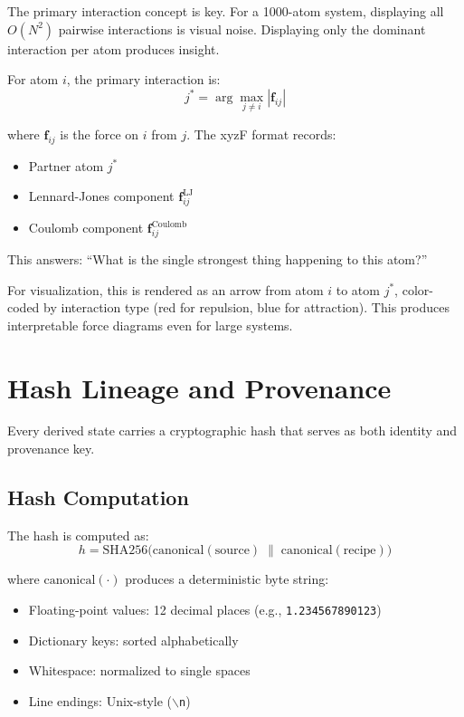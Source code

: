 \documentclass[11pt]{article}
\begin{document}
The primary interaction concept is key. For a 1000-atom system, displaying all $O(N^2)$ pairwise interactions is visual noise. Displaying only the dominant interaction per atom produces insight.

For atom $i$, the primary interaction is:
\begin{equation}
j^* = \arg\max_{j \neq i} |\mathbf{f}_{ij}|
\end{equation}

where $\mathbf{f}_{ij}$ is the force on $i$ from $j$. The xyzF format records:
\begin{itemize}
\item Partner atom $j^*$
\item Lennard-Jones component $\mathbf{f}_{ij}^{\text{LJ}}$
\item Coulomb component $\mathbf{f}_{ij}^{\text{Coulomb}}$
\end{itemize}

This answers: ``What is the single strongest thing happening to this atom?''

For visualization, this is rendered as an arrow from atom $i$ to atom $j^*$, color-coded by interaction type (red for repulsion, blue for attraction). This produces interpretable force diagrams even for large systems.

\section{Hash Lineage and Provenance}

Every derived state carries a cryptographic hash that serves as both identity and provenance key.

\subsection{Hash Computation}

The hash is computed as:
\begin{equation}
h = \text{SHA256}\bigl(\text{canonical}(\text{source}) \;\|\; \text{canonical}(\text{recipe})\bigr)
\end{equation}

where $\text{canonical}(\cdot)$ produces a deterministic byte string:
\begin{itemize}
\item Floating-point values: 12 decimal places (e.g., \texttt{1.234567890123})
\item Dictionary keys: sorted alphabetically
\item Whitespace: normalized to single spaces
\item Line endings: Unix-style (\texttt{$\backslash$n})
\end{itemize}
\end{document}

